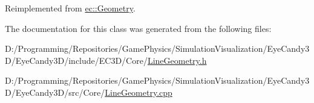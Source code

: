 Reimplemented from \mbox{\hyperlink{classec_1_1_geometry_a228d4a0fa01a17379f24aee2c769b501}{ec\+::\+Geometry}}.



The documentation for this class was generated from the following files\+:\begin{DoxyCompactItemize}
\item 
D\+:/\+Programming/\+Repositories/\+Game\+Physics/\+Simulation\+Visualization/\+Eye\+Candy3\+D/\+Eye\+Candy3\+D/include/\+E\+C3\+D/\+Core/\mbox{\hyperlink{_line_geometry_8h}{Line\+Geometry.\+h}}\item 
D\+:/\+Programming/\+Repositories/\+Game\+Physics/\+Simulation\+Visualization/\+Eye\+Candy3\+D/\+Eye\+Candy3\+D/src/\+Core/\mbox{\hyperlink{_line_geometry_8cpp}{Line\+Geometry.\+cpp}}\end{DoxyCompactItemize}
